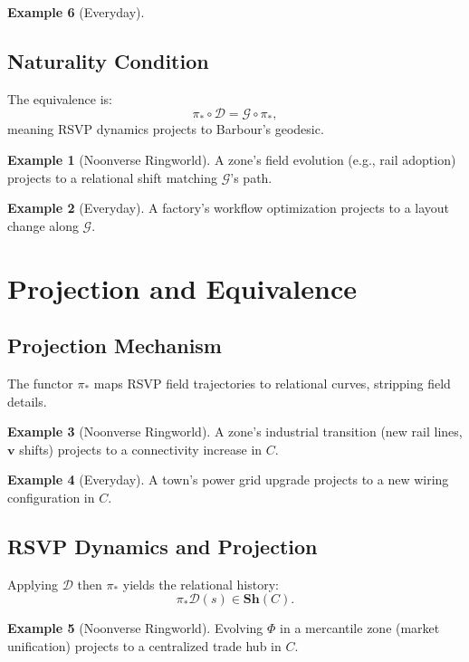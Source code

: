 \documentclass[11pt]{article}
\theoremstyle{plain}
\theoremstyle{definition}
\newtheorem{example}{Example}[section]
\begin{document}
\begin{example}[Everyday]
\subsection{Naturality Condition}
The equivalence is:
\begin{equation}
\pi_* \circ \mathcal{D} = \mathcal{G} \circ \pi_*,
\end{equation}
meaning RSVP dynamics projects to Barbour’s geodesic.

\begin{example}[Noonverse Ringworld]
A zone’s field evolution (e.g., rail adoption) projects to a relational shift matching $\mathcal{G}$’s path.
\end{example}

\begin{example}[Everyday]
A factory’s workflow optimization projects to a layout change along $\mathcal{G}$.
\end{example}

\section{Projection and Equivalence}

\subsection{Projection Mechanism}
The functor $\pi_*$ maps RSVP field trajectories to relational curves, stripping field details.

\begin{example}[Noonverse Ringworld]
A zone’s industrial transition (new rail lines, $\mathbf{v}$ shifts) projects to a connectivity increase in $C$.
\end{example}

\begin{example}[Everyday]
A town’s power grid upgrade projects to a new wiring configuration in $C$.
\end{example}

\subsection{RSVP Dynamics and Projection}
Applying $\mathcal{D}$ then $\pi_*$ yields the relational history:
\begin{equation}
\pi_* \mathcal{D}(s) \in \mathbf{Sh}(C).
\end{equation}

\begin{example}[Noonverse Ringworld]
Evolving $\Phi$ in a mercantile zone (market unification) projects to a centralized trade hub in $C$.
\end{example}


\end{example}
\end{document}
